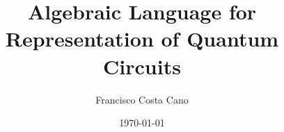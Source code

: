 \documentclass[a4paper,onecolumn,superscriptaddress,unpublished,draft,allowfontchageintitle]{quantumarticle}
\begin{document}
	\title{Algebraic Language for Representation of Quantum Circuits}
	\date{\today}
	\author{Francisco Costa Cano}

	
	\tableofcontents
	\maketitle

	
	
	
	
	
	
	
	
	
	
	
	\printbibliography
\end{document}
